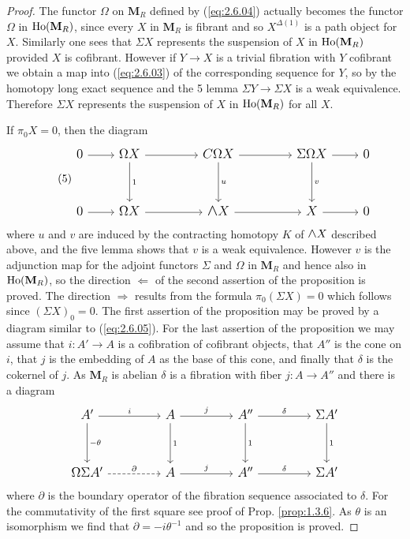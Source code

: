 \documentclass[../main]{subfiles}
\begin{document}
\begin{proof}
The functor $\Omega$ on $\mathbf{M}_R$ defined by (\ref{eq:2.6.04}) actually becomes the functor $\Omega$ in $\operatorname{Ho}(\mathbf{M}_R)$, since every $X$ in $\mathbf{M}_R$ is fibrant and so $X^{\Delta(1)}$ is a path object for $X$. Similarly one sees that $\Sigma X$ represents the suspension of $X$ in $\operatorname{Ho}(\mathbf{M}_R)$ provided $X$ is cofibrant. However if $Y\longrightarrow X$ is a trivial fibration with $Y$ cofibrant we obtain a map into (\ref{eq:2.6.03}) of the corresponding sequence for $Y$, so by the homotopy long exact sequence and the 5 lemma $\Sigma Y\longrightarrow\Sigma X$ is a weak equivalence. Therefore $\Sigma X$ represents the suspension of $X$ in $\operatorname{Ho}(\mathbf{M}_R)$ for all $X$.

If $\pi_0 X=0$, then the diagram
\begin{equation}\tag{5}
\label{eq:2.6.05}
\begin{tikzcd}[font=\large]
0\arrow{r}{}&\Omega X\arrow{rr}{}\arrow{dd}{1}&&C\Omega X\arrow{rr}{}\arrow{dd}{u}&&\Sigma\Omega X\arrow{r}{}\arrow{dd}{v}&0\\\\
0\arrow{r}{}&\Omega X\arrow{rr}&&\mathlarger{\mathlarger{\wedge}}X\arrow{rr}&& X\arrow{r}&0
\end{tikzcd}
\end{equation}
where $u$ and $v$ are induced by the contracting homotopy $K$ of $\mathlarger{\mathlarger{\wedge}}X$ described above, and the five lemma shows that $v$ is a weak equivalence. However $v$ is the adjunction map for the adjoint functors $\Sigma$ and $\Omega$ in $\mathbf{M}_R$ and hence also in $\operatorname{Ho}(\mathbf{M}_R)$, so the direction $\Longleftarrow$ of the second assertion of the proposition is proved. The direction $\Longrightarrow$ results from the formula $\pi_0(\Sigma X)=0$ which follows since $(\Sigma X)_0=0$. The first assertion of the proposition may be proved by a diagram similar to (\ref{eq:2.6.05}). For the last assertion of the proposition we may assume that $i:A'\longrightarrow A$ is a cofibration of cofibrant objects, that $A''$ is the cone on $i$, that $j$ is the embedding of $A$ as the base of this cone, and finally that $\delta$ is the cokernel of $j$. As $\mathbf{M}_R$ is abelian $\delta$ is a fibration with fiber $j:A\longrightarrow A''$ and there is a diagram
\begin{equation*}
\begin{tikzcd}[font=\large]
A'\arrow{rr}{i}\arrow{dd}{-\theta}&&A\arrow{rr}{j}\arrow{dd}{1}&&A''\arrow{rr}{\delta}\arrow{dd}{1}&&\Sigma A'\arrow{dd}{1}\\\\
\Omega\Sigma A'\arrow[dashed]{rr}{\partial}&&A\arrow{rr}{j}&&A''\arrow{rr}{\delta}&&\Sigma A'
\end{tikzcd}
\end{equation*}
where $\partial$ is the boundary operator of the fibration sequence associated to $\delta$. For the commutativity of the first square see proof of Prop. \ref{prop:1.3.6}. As $\theta$ is an isomorphism we find that $\partial=-i\theta^{-1}$ and so the proposition is proved.
\end{proof}
\end{document}
